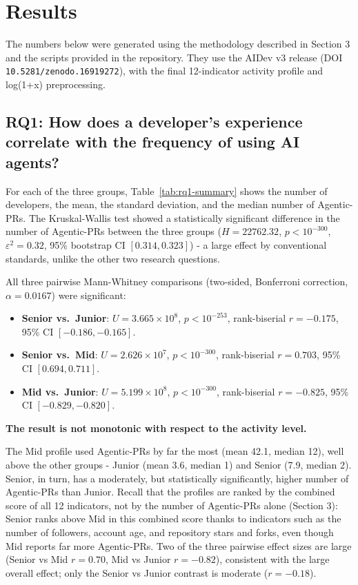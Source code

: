\section{Results\label{sec:results}}
The numbers below were generated using the methodology described in Section 3 and the scripts provided in the repository. They use the AIDev v3 release (DOI \texttt{10.5281/zenodo.16919272}), with the final 12-indicator activity profile and log(1+x) preprocessing.

\subsection{RQ1: How does a developer's experience correlate with the frequency of using AI agents?}
For each of the three groups, Table~\ref{tab:rq1-summary} shows the number of developers, the mean, the standard deviation, and the median number of Agentic-PRs. The Kruskal-Wallis test showed a statistically significant difference in the number of Agentic-PRs between the three groups ($H = 22762.32$, $p < 10^{-300}$, $\varepsilon^2 = 0.32$, 95\% bootstrap CI $[0.314, 0.323]$) - a large effect by conventional standards, unlike the other two research questions.

All three pairwise Mann-Whitney comparisons (two-sided, Bonferroni correction, $\alpha = 0.0167$) were significant:
\begin{itemize}
    \item \textbf{Senior vs.\ Junior}: $U = 3.665\times10^{8}$, $p < 10^{-253}$, rank-biserial $r = -0.175$, 95\% CI $[-0.186, -0.165]$.
    \item \textbf{Senior vs.\ Mid}: $U = 2.626\times10^{7}$, $p < 10^{-300}$, rank-biserial $r = 0.703$, 95\% CI $[0.694, 0.711]$.
    \item \textbf{Mid vs.\ Junior}: $U = 5.199\times10^{8}$, $p < 10^{-300}$, rank-biserial $r = -0.825$, 95\% CI $[-0.829, -0.820]$.
\end{itemize}

\textbf{The result is not monotonic with respect to the activity level.}

The Mid profile used Agentic-PRs by far the most (mean 42.1, median 12), well above the other groups - Junior (mean 3.6, median 1) and Senior (7.9, median 2). Senior, in turn, has a moderately, but statistically significantly, higher number of Agentic-PRs than Junior. Recall that the profiles are ranked by the combined score of all 12 indicators, not by the number of Agentic-PRs alone (Section 3): Senior ranks above Mid in this combined score thanks to indicators such as the number of followers, account age, and repository stars and forks, even though Mid reports far more Agentic-PRs. Two of the three pairwise effect sizes are large (Senior vs Mid $r = 0.70$, Mid vs Junior $r = -0.82$), consistent with the large overall effect; only the Senior vs Junior contrast is moderate ($r = -0.18$).

